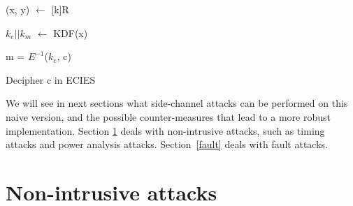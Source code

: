 \documentclass[journal]{IEEEtran}
\begin{document}
\begin{algorithm}

    \SetAlgoLined

    \SetSideCommentLeft 
    \SetNoFillComment

    \LinesNumbered

    
    (x, y) $\leftarrow$ [k]R\;

    $k_e||k_m$ $\leftarrow$ KDF(x)\;
    

    m = $E^{-1}$($k_e$, c)\;


    \caption{Decipher c in ECIES}
    \label{ecies-decrypt}

\end{algorithm}


%    
%
%
%
%    
%
%    


We will see in next sections what side-channel attacks can be performed on this naive version, 
and the possible counter-measures that lead to a more robust implementation. Section \ref{non-intrusive}
deals with non-intrusive attacks, such as timing attacks and power analysis attacks. Section~\ref{fault}
deals with fault attacks.



\section{Non-intrusive attacks}
\label{non-intrusive}  
\end{document}
